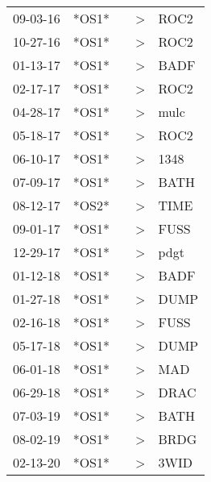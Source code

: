 \begin{supertabular}{p{0.07\textwidth}p{0.06\textwidth}p{0.02\textwidth}p{0.02\textwidth}p{0.06\textwidth}}
 09-03-16\textsuperscript{} &  *OS1* &   &  \textgreater &  ROC2\textsuperscript{} \\
 10-27-16\textsuperscript{} &  *OS1* &   &  \textgreater &  ROC2\textsuperscript{} \\
 01-13-17\textsuperscript{} &  *OS1* &   &  \textgreater &  BADF\textsuperscript{} \\
 02-17-17\textsuperscript{} &  *OS1* &   &  \textgreater &  ROC2\textsuperscript{} \\
 04-28-17\textsuperscript{} &  *OS1* &   &  \textgreater &  mulc\textsuperscript{} \\
 05-18-17\textsuperscript{} &  *OS1* &   &  \textgreater &  ROC2\textsuperscript{} \\
 06-10-17\textsuperscript{} &  *OS1* &   &  \textgreater &  1348\textsuperscript{} \\
 07-09-17\textsuperscript{} &  *OS1* &   &  \textgreater &  BATH\textsuperscript{} \\
 08-12-17\textsuperscript{} &  *OS2* &   &  \textgreater &  TIME\textsuperscript{} \\
 09-01-17\textsuperscript{} &  *OS1* &   &  \textgreater &  FUSS\textsuperscript{} \\
 12-29-17\textsuperscript{} &  *OS1* &   &  \textgreater &  pdgt\textsuperscript{} \\
 01-12-18\textsuperscript{} &  *OS1* &   &  \textgreater &  BADF\textsuperscript{} \\
 01-27-18\textsuperscript{} &  *OS1* &   &  \textgreater &  DUMP\textsuperscript{} \\
 02-16-18\textsuperscript{} &  *OS1* &   &  \textgreater &  FUSS\textsuperscript{} \\
 05-17-18\textsuperscript{} &  *OS1* &   &  \textgreater &  DUMP\textsuperscript{} \\
 06-01-18\textsuperscript{} &  *OS1* &   &  \textgreater &   MAD\textsuperscript{} \\
 06-29-18\textsuperscript{} &  *OS1* &   &  \textgreater &  DRAC\textsuperscript{} \\
 07-03-19\textsuperscript{} &  *OS1* &   &  \textgreater &  BATH\textsuperscript{} \\
 08-02-19\textsuperscript{} &  *OS1* &   &  \textgreater &  BRDG\textsuperscript{} \\
 02-13-20\textsuperscript{} &  *OS1* &   &  \textgreater &  3WID\textsuperscript{} \\
\end{supertabular}
